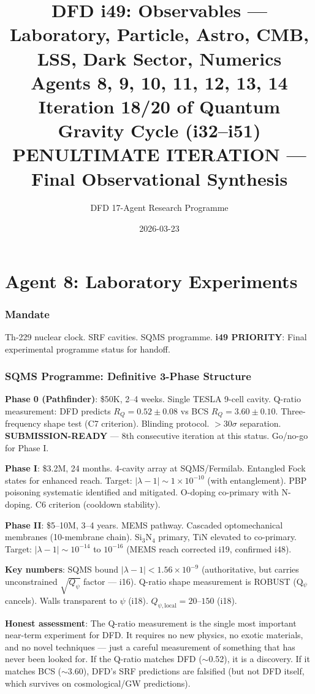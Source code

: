 \documentclass[11pt,a4paper]{article}
\title{DFD i49: Observables --- Laboratory, Particle, Astro, CMB, LSS, Dark Sector, Numerics\\[6pt]
\large Agents 8, 9, 10, 11, 12, 13, 14\\[6pt]
\normalsize Iteration 18/20 of Quantum Gravity Cycle (i32--i51)\\[6pt]
\textbf{PENULTIMATE ITERATION --- Final Observational Synthesis}}
\author{DFD 17-Agent Research Programme}
\date{2026-03-23}
\begin{document}
\maketitle
\tableofcontents
\newpage

\part{Agent 8: Laboratory Experiments}
\label{part:agent8}

\section{Mandate}

Th-229 nuclear clock. SRF cavities. SQMS programme. \textbf{i49 PRIORITY}: Final experimental programme status for handoff.

\section{SQMS Programme: Definitive 3-Phase Structure}

\begin{tcolorbox}[colback=blue!5!white, colframe=blue!60!black,
  title={SQMS Detection Programme: Final Status for Handoff}]

\textbf{Phase 0 (Pathfinder)}: \$50K, 2--4 weeks. Single TESLA 9-cell cavity. Q-ratio measurement: DFD predicts $R_Q = 0.52 \pm 0.08$ vs BCS $R_Q = 3.60 \pm 0.10$. Three-frequency shape test (C7 criterion). Blinding protocol. $>30\sigma$ separation. \textbf{SUBMISSION-READY} --- 8th consecutive iteration at this status. Go/no-go for Phase I.

\textbf{Phase I}: \$3.2M, 24 months. 4-cavity array at SQMS/Fermilab. Entangled Fock states for enhanced reach. Target: $|\lambda-1| \sim 1 \times 10^{-10}$ (with entanglement). PBP poisoning systematic identified and mitigated. O-doping co-primary with N-doping. C6 criterion (cooldown stability).

\textbf{Phase II}: \$5--10M, 3--4 years. MEMS pathway. Cascaded optomechanical membranes (10-membrane chain). Si$_3$N$_4$ primary, TiN elevated to co-primary. Target: $|\lambda-1| \sim 10^{-14}$ to $10^{-16}$ (MEMS reach corrected i19, confirmed i48).

\textbf{Key numbers}: SQMS bound $|\lambda-1| < 1.56 \times 10^{-9}$ (authoritative, but carries unconstrained $\sqrt{Q_\psi}$ factor --- i16). Q-ratio shape measurement is ROBUST (Q$_\psi$ cancels). Walls transparent to $\psi$ (i18). $Q_{\psi,\text{local}} = 20$--$150$ (i18).

\textbf{Honest assessment}: The Q-ratio measurement is the single most important near-term experiment for DFD. It requires no new physics, no exotic materials, and no novel techniques --- just a careful measurement of something that has never been looked for. If the Q-ratio matches DFD ($\sim$0.52), it is a discovery. If it matches BCS ($\sim$3.60), DFD's SRF predictions are falsified (but not DFD itself, which survives on cosmological/GW predictions).
\end{tcolorbox}
\end{document}
